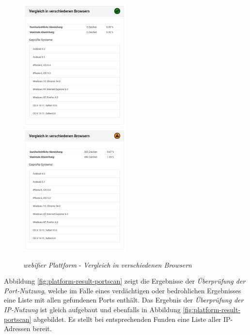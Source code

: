 \begin{figure}[H]
\centerline{%
\includegraphics[width=0.5\textwidth]{images/platform/header-inspection-clean}%
\includegraphics[width=0.5\textwidth]{images/platform/header-inspection-suspicious}%
}%
\caption{\textit{webifier Plattform} - \textit{Vergleich in verschiedenen Browsern}}
\label{fig:platform-result-header-inspection}
\end{figure}

Abbildung \ref{fig:platform-result-portscan} zeigt die Ergebnisse der \textit{Überprüfung der
Port-Nutzung}, welche im Falle eines verdächtigen oder bedrohlichen Ergebnisses eine Liste mit allen
gefundenen Ports enthält. Das Ergebnis der \textit{Überprüfung der IP-Nutzung} ist gleich aufgebaut
und ebenfalls in Abbildung \ref{fig:platform-result-portscan} abgebildet. Es stellt bei
entsprechenden Funden eine Liste aller IP-Adressen bereit.

